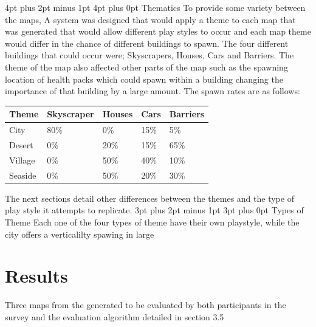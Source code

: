 \documentclass[12pt,a4paper,oneside]{book}
\makeatletter
\renewcommand\subsection{\@startsection {subsection}{1}{2mm} %
                               {3pt plus 2pt minus 1pt} %
                               {3pt plus 0pt} %
                               {\normalfont\bfseries}}
\renewcommand\section{\@startsection {section}{1}{0mm} %
                               {4pt plus 2pt minus 1pt} %
                               {4pt plus 0pt} %
                               {\bfseries}}
\makeatother
\begin{document}
\section{Thematics}
To provide some variety between the maps, A system was designed that would apply a theme to each map that was generated that would allow different play styles to occur and each map theme would differ in the chance of different buildings to spawn. The four different buildings that could occur were; Skyscrapers, Houses, Cars and Barriers. The theme of the map also affected other parts of the map such as the spawning location of health packs which could spawn within a building changing the importance of that building by a large amount. The spawn rates are as follows: 
\vspace{5mm} 
\newline 
\begin{tabular}{ |p{3cm}||p{2cm}|p{2cm}|p{2cm}|p{2cm}|  }
	\hline
	Theme& Skyscraper &Houses&Cars & Barriers\\
	\hline
	City   & 80\%    &0\% &   15\% & 5\%\\
	Desert & 0\%    &20\% &   15\% & 65\%\\
	Village &0\%    &50\% &   40\% & 10\%\\
	Seaside  &0\%    &50\% &   20\% &30\%\\
	\hline
\end{tabular} 
\vspace{5mm} 
\newline
The next sections detail other differences between the themes and the type of play style it attempts to replicate. 
\subsection{Types of Theme}
Each one of the four types of theme have their own playstyle, while the city offers a verticalilty spawing in large 

\chapter{Results}
Three maps from the generated to be evaluated by both participants in the survey and the evaluation algorithm detailed in section 3.5
\end{document}
